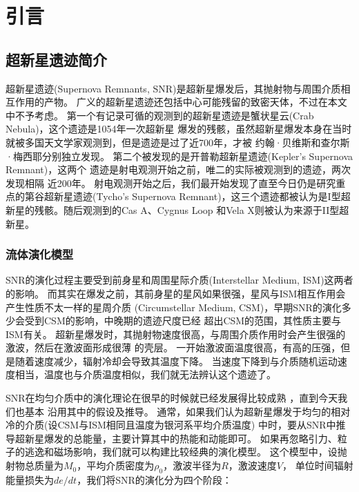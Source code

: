 \chapter{引言}
\label{Intro}

\section{超新星遗迹简介}
\label{SNRintro}
超新星遗迹(Supernova Remnants, SNR)是超新星爆发后，其抛射物与周围介质相互作用的产物。
广义的超新星遗迹还包括中心可能残留的致密天体，不过在本文中不予考虑。
第一个有记录可循的观测到的超新星遗迹是蟹状星云(Crab Nebula)，这个遗迹是1054年一次超新星
爆发的残骸，虽然超新星爆发本身在当时就被多国天文学家观测到，但是遗迹是过了近700年，才被
约翰·贝维斯和查尔斯·梅西耶分别独立发现\citep{barrow2011cosmic}。
第二个被发现的是开普勒超新星遗迹(Kepler's Supernova Remnant)\citep{Baade1943}，这两个
遗迹是射电观测开始之前，唯二的实际被观测到的遗迹\citep{Minkowski1964}，两次发现相隔
近200年。
射电观测开始之后，我们最开始发现了直至今日仍是研究重点的第谷超新星遗迹(Tycho's
Supernova Remnant)，这三个遗迹都被认为是I型超新星的残骸。随后观测到的Cas A、Cygnus Loop
和Vela X则被认为来源于II型超新星。

\subsection{流体演化模型}

SNR的演化过程主要受到前身星和周围星际介质(Interstellar Medium, ISM)这两者的影响。
而其实在爆发之前，其前身星的星风如果很强，星风与ISM相互作用会产生性质不太一样的星周介质
(Circumstellar Medium, CSM)，早期SNR的演化多少会受到CSM的影响，中晚期的遗迹尺度已经
超出CSM的范围，其性质主要与ISM有关。
超新星爆发时，其抛射物速度很高，与周围介质作用时会产生很强的激波，然后在激波面形成很薄
的壳层。
一开始激波面温度很高，有高的压强，但是随着速度减少，辐射冷却会导致其温度下降。
当速度下降到与介质随机运动速度相当，温度也与介质温度相似，我们就无法辨认这个遗迹了。

SNR在均匀介质中的演化理论在很早的时候就已经发展得比较成熟
\citep{1959sdmm.book.....S, 1970IAUS...39..229W, Woltjer1972}，直到今天我们也基本
沿用其中的假设及推导。
通常，如果我们认为超新星爆发于均匀的相对冷的介质(设CSM与ISM相同且温度为银河系平均介质温度)
中时，要从SNR中推导超新星爆发的总能量，主要计算其中的热能和动能即可。
如果再忽略引力、粒子的逃逸和磁场影响，我们就可以构建比较经典的演化模型。
这个模型中，设抛射物总质量为$M_0$，平均介质密度为$\rho_0$，激波半径为$R$，激波速度$V$，
单位时间辐射能量损失为$de/dt$，我们将SNR的演化分为四个阶段：

